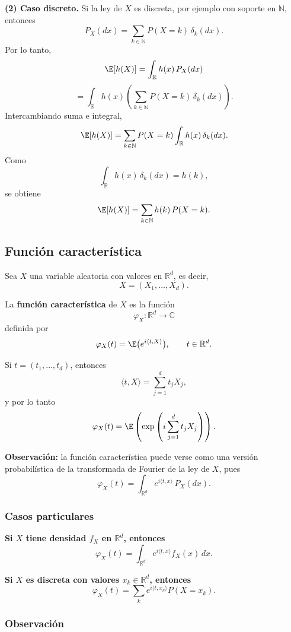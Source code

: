 \medskip

\noindent
\textbf{(2) Caso discreto.}  
Si la ley de $X$ es discreta, por ejemplo con soporte en $\mathbb{N}$, entonces
\[
P_X(dx)=\sum_{k\in\mathbb{N}} P(X=k)\,\delta_k(dx).
\]
Por lo tanto,
\[
\E[h(X)]
=
\int_{\mathbb{R}} h(x)\,P_X(dx)
\]
\[
=
\int_{\mathbb{R}} h(x)\left(\sum_{k\in\mathbb{N}} P(X=k)\,\delta_k(dx)\right).
\]
Intercambiando suma e integral,
\[
\E[h(X)]
=
\sum_{k\in\mathbb{N}} P(X=k)\int_{\mathbb{R}} h(x)\,\delta_k(dx).
\]
Como
\[
\int_{\mathbb{R}} h(x)\,\delta_k(dx)=h(k),
\]
se obtiene
\[
\E[h(X)]
=
\sum_{k\in\mathbb{N}} h(k)\,P(X=k).
\]

\subsection{Función característica}

Sea $X$ una variable aleatoria con valores en $\mathbb{R}^d$, es decir,
\[
X=(X_1,\dots,X_d).
\]

La \textbf{función característica} de $X$ es la función
\[
\varphi_X:\mathbb{R}^d\to\mathbb{C}
\]
definida por
\[
\varphi_X(t)=\E\big(e^{i\langle t,X\rangle}\big),
\qquad t\in\mathbb{R}^d.
\]

Si $t=(t_1,\dots,t_d)$, entonces
\[
\langle t,X\rangle=\sum_{j=1}^d t_jX_j,
\]
y por lo tanto
\[
\varphi_X(t)
=
\E\left(\exp\left(i\sum_{j=1}^d t_jX_j\right)\right).
\]

\medskip

\noindent
\textbf{Observación:} la función característica puede verse como una versión probabilística de la transformada de Fourier de la ley de $X$, pues
\[
\varphi_X(t)=\int_{\mathbb{R}^d} e^{i\langle t,x\rangle}\,P_X(dx).
\]

\subsubsection*{Casos particulares}

\textbf{Si $X$ tiene densidad $f_X$ en $\mathbb{R}^d$, entonces}
\[
\varphi_X(t)
=
\int_{\mathbb{R}^d} e^{i\langle t,x\rangle}f_X(x)\,dx.
\]

\textbf{Si $X$ es discreta con valores $x_k\in\mathbb{R}^d$, entonces}
\[
\varphi_X(t)
=
\sum_k e^{i\langle t,x_k\rangle}P(X=x_k).
\]

\subsubsection*{Observación}

